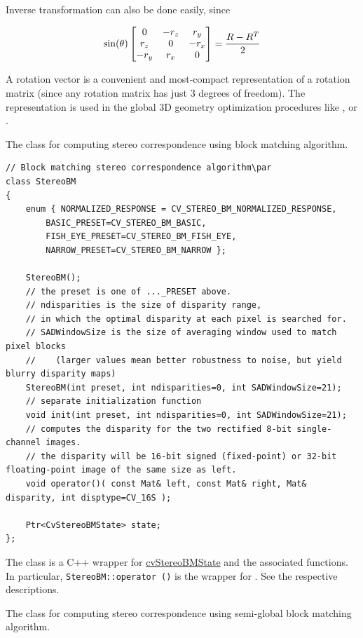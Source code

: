Inverse transformation can also be done easily, since

\[
\sin(\theta)
\begin{bmatrix} 0 & -r_z & r_y\\ r_z & 0 & -r_x\\ -r_y & r_x & 0 \end{bmatrix}
=
\frac{R - R^T}{2}
\]

A rotation vector is a convenient and most-compact representation of a rotation matrix
(since any rotation matrix has just 3 degrees of freedom). The representation is
used in the global 3D geometry optimization procedures like ,
 or .


\ifCpp

The class for computing stereo correspondence using block matching algorithm.

\begin{lstlisting}
// Block matching stereo correspondence algorithm\par
class StereoBM
{
    enum { NORMALIZED_RESPONSE = CV_STEREO_BM_NORMALIZED_RESPONSE,
        BASIC_PRESET=CV_STEREO_BM_BASIC,
        FISH_EYE_PRESET=CV_STEREO_BM_FISH_EYE,
        NARROW_PRESET=CV_STEREO_BM_NARROW };

    StereoBM();
    // the preset is one of ..._PRESET above.
    // ndisparities is the size of disparity range,
    // in which the optimal disparity at each pixel is searched for.
    // SADWindowSize is the size of averaging window used to match pixel blocks
    //    (larger values mean better robustness to noise, but yield blurry disparity maps)
    StereoBM(int preset, int ndisparities=0, int SADWindowSize=21);
    // separate initialization function
    void init(int preset, int ndisparities=0, int SADWindowSize=21);
    // computes the disparity for the two rectified 8-bit single-channel images.
    // the disparity will be 16-bit signed (fixed-point) or 32-bit floating-point image of the same size as left.
    void operator()( const Mat& left, const Mat& right, Mat& disparity, int disptype=CV_16S );

    Ptr<CvStereoBMState> state;
};
\end{lstlisting}

The class is a C++ wrapper for \hyperref[CvStereoBMState]{cvStereoBMState} and the associated functions. In particular, \texttt{StereoBM::operator ()} is the wrapper for . See the respective descriptions.


The class for computing stereo correspondence using semi-global block matching algorithm.


